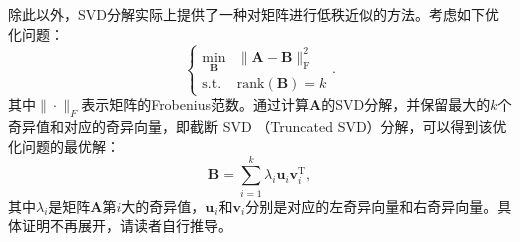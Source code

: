 除此以外，SVD分解实际上提供了一种对矩阵进行低秩近似的方法。考虑如下优化问题：
\begin{equation}
    \begin{cases}
        \min_{\mathbf{B}} & \|\mathbf{A} - \mathbf{B}\|_{\mathrm{F}}^2 \\
        \text{s.t.}       & \text{rank}(\mathbf{B}) = k
    \end{cases}.
    \label{eq:sparse-approximation}
\end{equation}
其中\( \|\cdot\|_F \)表示矩阵的Frobenius范数。通过计算\( \mathbf{A} \)的SVD分解，并保留最大的\( k \)个奇异值和对应的奇异向量，即截断 SVD （Truncated SVD）分解，可以得到该优化问题的最优解：
\begin{equation}
    \mathbf{B} = \sum_{i=1}^{k} \lambda_i \bm{u}_i \bm{v}_i^{\mathrm{T}},
    \label{eq:sparse-approximation-solution}
\end{equation}
其中\( \lambda_i \)是矩阵\( \mathbf{A} \)第\( i \)大的奇异值，\( \bm{u}_i \)和\( \bm{v}_i \)分别是对应的左奇异向量和右奇异向量。具体证明不再展开，请读者自行推导。

